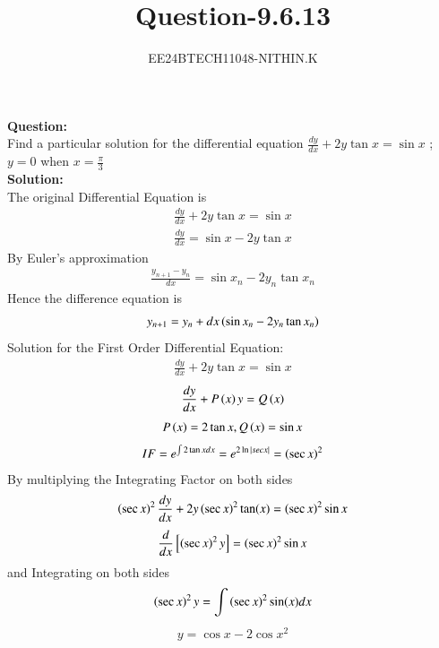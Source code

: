 \documentclass[journal]{IEEEtran}
\numberwithin{equation}{enumi}
\numberwithin{figure}{enumi}
\begin{document}


\title{Question-9.6.13}
\author{EE24BTECH11048-NITHIN.K} 
{\let\newpage\relax\maketitle}
\textbf{Question:} \\
Find a particular solution for the differential equation $\frac{dy}{dx} + 2y\tan x = \sin x$ ; $y = 0$ when $x = \frac{\pi}{3}$ \\
\textbf{Solution:} \\
The original Differential Equation is \\
\begin{align}
	\frac{dy}{dx} + 2y\tan x = \sin x
\end{align}
\begin{align}
	\frac{dy}{dx} = \sin x - 2y\tan x
\end{align}
By Euler's approximation
\begin{align}                                                                   
	\frac{y_{n+1} - y_n}{dx} = \sin x_n - 2y_n\tan x_n 
\end{align}
Hence the difference equation is
\begin{align}
	y_{n+1} = y_n + dx\left(\sin x_n - 2y_n\tan x_n\right)
\end{align}
Solution for the First Order Differential Equation:
\begin{align}
	\frac{dy}{dx} + 2y\tan x = \sin x
\end{align}
\begin{align}
	\frac{dy}{dx} + P\left(x\right)y = Q\left(x\right)
\end{align}
\begin{align}
	P\left(x\right) = 2\tan x , Q\left(x\right) = \sin x
\end{align}
\begin{align}
	IF = e^{\int2\tan x dx} = e^{2\ln|secx|} = \left(\sec x\right)^2
\end{align}
By multiplying the Integrating Factor on both sides
\begin{align}
	\left(\sec x\right)^2\frac{dy}{dx} + 2y\left(\sec x\right)^2\tan(x) = \left(\sec x\right)^2\sin x
\end{align}
\begin{align}
	\frac{d}{dx}{}\left[\left(\sec x\right)^2y\right] = \left(\sec x\right)^2\sin x
\end{align}
and Integrating on both sides
\begin{align}
	\left(\sec x\right)^2y = \int\left(\sec x\right)^2\sin(x)dx
\end{align}
\begin{align}
	y = \cos x - 2{\cos x}^2
\end{align}
\end{document}
